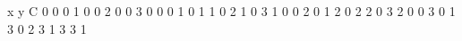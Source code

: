 x y C
0 0 0
1 0 0
2 0 0
3 0 0
0 1 0
1 1 0
2 1 0
3 1 0
0 2 0
1 2 0
2 2 0
3 2 0
0 3 0
1 3 0
2 3 1
3 3 1
